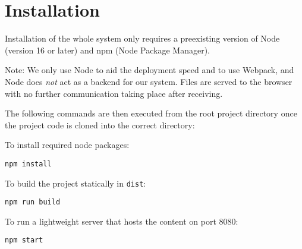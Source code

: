 \section{Installation}

Installation of the whole system only requires a preexisting version of Node (version 16 or later) and npm (Node Package Manager).

Note: We only use Node to aid the deployment speed and to use Webpack, and Node does {\it not} act as a backend for our system. Files are served to the browser with no further communication taking place after receiving.

The following commands are then executed from the root project directory once the project code is cloned into the correct directory:

To install required node packages:

\verb|npm install|

To build the project statically in \verb|dist|:

\verb|npm run build|

To run a lightweight server that hosts the content on port 8080:

\verb|npm start|
